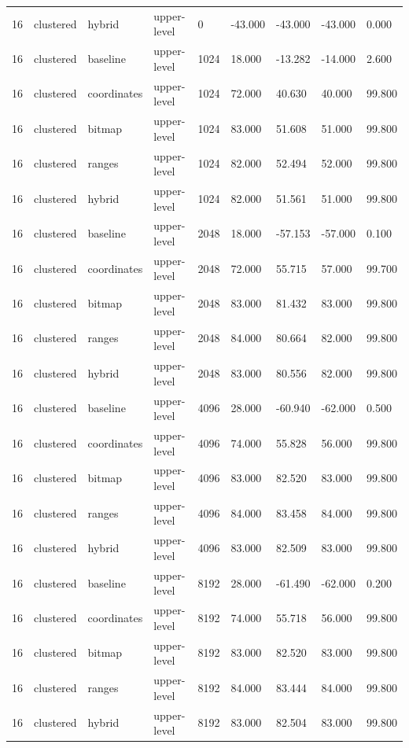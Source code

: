 \begin{tabular}{lllllllll}
16 & clustered & hybrid & upper-level & 0 & -43.000 & -43.000 & -43.000 & 0.000 \\
16 & clustered & baseline & upper-level & 1024 & 18.000 & -13.282 & -14.000 & 2.600 \\
16 & clustered & coordinates & upper-level & 1024 & 72.000 & 40.630 & 40.000 & 99.800 \\
16 & clustered & bitmap & upper-level & 1024 & 83.000 & 51.608 & 51.000 & 99.800 \\
16 & clustered & ranges & upper-level & 1024 & 82.000 & 52.494 & 52.000 & 99.800 \\
16 & clustered & hybrid & upper-level & 1024 & 82.000 & 51.561 & 51.000 & 99.800 \\
16 & clustered & baseline & upper-level & 2048 & 18.000 & -57.153 & -57.000 & 0.100 \\
16 & clustered & coordinates & upper-level & 2048 & 72.000 & 55.715 & 57.000 & 99.700 \\
16 & clustered & bitmap & upper-level & 2048 & 83.000 & 81.432 & 83.000 & 99.800 \\
16 & clustered & ranges & upper-level & 2048 & 84.000 & 80.664 & 82.000 & 99.800 \\
16 & clustered & hybrid & upper-level & 2048 & 83.000 & 80.556 & 82.000 & 99.800 \\
16 & clustered & baseline & upper-level & 4096 & 28.000 & -60.940 & -62.000 & 0.500 \\
16 & clustered & coordinates & upper-level & 4096 & 74.000 & 55.828 & 56.000 & 99.800 \\
16 & clustered & bitmap & upper-level & 4096 & 83.000 & 82.520 & 83.000 & 99.800 \\
16 & clustered & ranges & upper-level & 4096 & 84.000 & 83.458 & 84.000 & 99.800 \\
16 & clustered & hybrid & upper-level & 4096 & 83.000 & 82.509 & 83.000 & 99.800 \\
16 & clustered & baseline & upper-level & 8192 & 28.000 & -61.490 & -62.000 & 0.200 \\
16 & clustered & coordinates & upper-level & 8192 & 74.000 & 55.718 & 56.000 & 99.800 \\
16 & clustered & bitmap & upper-level & 8192 & 83.000 & 82.520 & 83.000 & 99.800 \\
16 & clustered & ranges & upper-level & 8192 & 84.000 & 83.444 & 84.000 & 99.800 \\
16 & clustered & hybrid & upper-level & 8192 & 83.000 & 82.504 & 83.000 & 99.800 \\

\end{tabular}
